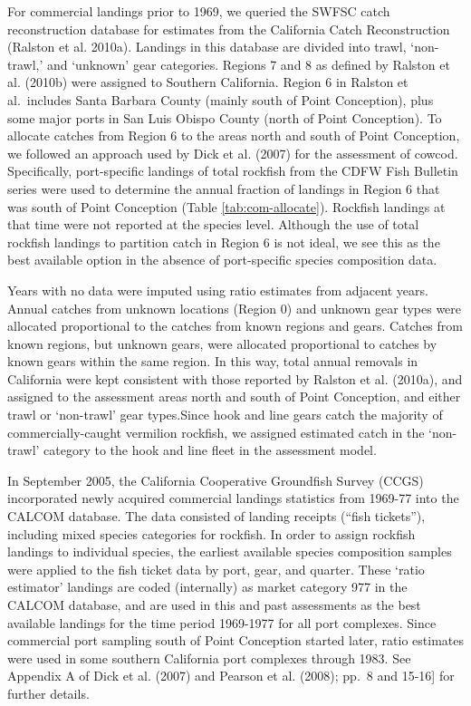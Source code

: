 \documentclass[
  english,
  a4paper,
]{article}
\begin{document}
For commercial landings prior to 1969, we queried the SWFSC catch reconstruction
database for estimates from the California Catch Reconstruction (Ralston et al. 2010a).
Landings in this database are divided into trawl, `non-trawl,' and `unknown' gear
categories. Regions 7 and 8 as defined by Ralston et al. (2010b) were
assigned to Southern California. Region 6 in Ralston et al.~includes Santa
Barbara County (mainly south of Point Conception), plus some major ports in San
Luis Obispo County (north of Point Conception). To allocate catches from Region
6 to the areas north and south of Point Conception, we followed an approach used
by Dick et al. (2007) for the assessment of cowcod. Specifically,
port-specific landings of total rockfish from the CDFW Fish Bulletin series were
used to determine the annual fraction of landings in Region 6 that was south of
Point Conception (Table \ref{tab:com-allocate}). Rockfish landings at that time were not reported
at the species level. Although the use of total rockfish landings to partition
catch in Region 6 is not ideal, we see this as the best available option in the
absence of port-specific species composition data.

Years with no data were imputed
using ratio estimates from adjacent years. Annual catches from unknown locations
(Region 0) and unknown gear types were allocated proportional to the catches from
known regions and gears. Catches from known regions, but unknown gears, were
allocated proportional to catches by known gears within the same region. In this way,
total annual removals in California were kept consistent with those reported by
Ralston et al. (2010a), and assigned to the assessment areas north and
south of Point Conception, and either trawl or `non-trawl' gear types.Since hook and line gears catch the majority of
commercially-caught vermilion rockfish, we assigned estimated catch in the
`non-trawl' category to the hook and line fleet in the assessment model.

In September 2005, the California Cooperative Groundfish Survey (CCGS)
incorporated newly acquired commercial landings statistics from 1969-77 into
the CALCOM database. The data consisted of landing receipts (``fish tickets''),
including mixed species categories for rockfish. In order to assign rockfish
landings to individual species, the earliest available species composition
samples were applied to the fish ticket data by port, gear, and quarter. These
`ratio estimator' landings are coded (internally) as market category 977 in the
CALCOM database, and are used in this and past assessments as the best available
landings for the time period 1969-1977 for all port complexes. Since commercial
port sampling south of Point Conception started later, ratio estimates were used
in some southern California port complexes through 1983. See Appendix A of Dick
et al. (2007) and Pearson et al. (2008); pp.~8 and 15-16{]} for
further details.
\end{document}
